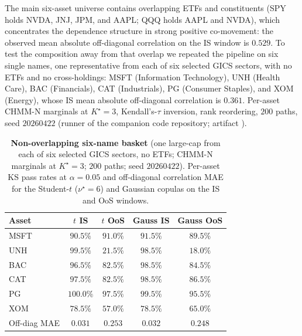 The main six-asset universe contains overlapping ETFs and constituents (SPY holds NVDA, JNJ, JPM, and AAPL; QQQ holds AAPL and NVDA), which concentrates the dependence structure in strong positive co-movement: the observed mean absolute off-diagonal correlation on the IS window is $0.529$. To test the composition away from that overlap we repeated the pipeline on six single names, one representative from each of six selected GICS sectors, with no ETFs and no cross-holdings: MSFT (Information Technology), UNH (Health Care), BAC (Financials), CAT (Industrials), PG (Consumer Staples), and XOM (Energy), whose IS mean absolute off-diagonal correlation is $0.361$. Per-asset CHMM-N marginals at $K^\star = 3$, Kendall's-$\tau$ inversion, rank reordering, $200$ paths, seed $20260422$ (runner  of the companion code repository; artifact ).

\begin{table}[!ht]
\centering
\small
\caption{\textbf{Non-overlapping six-name basket} (one large-cap from each of six selected GICS sectors, no ETFs; CHMM-N marginals at $K^\star = 3$; $200$ paths; seed $20260422$). Per-asset KS pass rates at $\alpha = 0.05$ and off-diagonal correlation MAE for the Student-$t$ ($\nu^\star = 6$) and Gaussian copulas on the IS and OoS windows.}
\label{tab:nonoverlap_basket}
\begin{tabular}{l c c c c}
\toprule
Asset & $t$ IS & $t$ OoS & Gauss IS & Gauss OoS \\
\midrule
MSFT & $90.5\%$ & $91.0\%$ & $91.5\%$ & $89.5\%$ \\
UNH  & $99.5\%$ & $21.5\%$ & $98.5\%$ & $18.0\%$ \\
BAC  & $96.5\%$ & $82.5\%$ & $98.5\%$ & $84.5\%$ \\
CAT  & $97.5\%$ & $82.5\%$ & $98.5\%$ & $86.5\%$ \\
PG   & $100.0\%$ & $97.5\%$ & $99.5\%$ & $95.5\%$ \\
XOM  & $78.5\%$ & $57.0\%$ & $78.5\%$ & $65.0\%$ \\
\midrule
Off-diag MAE & $0.031$ & $0.253$ & $0.032$ & $0.248$ \\
\bottomrule
\end{tabular}
\end{table}

